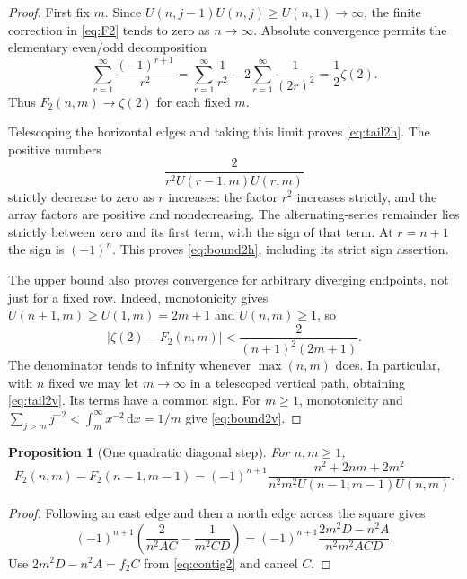 \documentclass[11pt]{article}
\numberwithin{equation}{section}
\newtheorem{proposition}[theorem]{Proposition}
\theoremstyle{definition}
\theoremstyle{remark}
\newcommand{\dd}{\,\mathrm d}
\begin{document}
\begin{proof}
First fix $m$. Since $U(n,j-1)U(n,j)\geq U(n,1)\to\infty$,
the finite correction in \eqref{eq:F2} tends to zero as $n\to\infty$.
Absolute convergence permits the elementary even/odd decomposition
\[
 \sum_{r=1}^\infty\frac{(-1)^{r+1}}{r^2}
 =\sum_{r=1}^\infty\frac1{r^2}
   -2\sum_{r=1}^\infty\frac1{(2r)^2}
 =\frac12\zeta(2).
\]
Thus $F_2(n,m)\to\zeta(2)$ for each fixed $m$.

Telescoping the horizontal edges and taking this limit proves
\eqref{eq:tail2h}. The positive numbers
\[
 \frac{2}{r^2U(r-1,m)U(r,m)}
\]
strictly decrease to zero as $r$ increases: the factor $r^2$ increases
strictly, and the array factors are positive and nondecreasing.
The alternating-series remainder lies strictly between zero and its
first term, with the sign of that term. At $r=n+1$ the sign is $(-1)^n$.
This proves \eqref{eq:bound2h}, including its strict sign assertion.

The upper bound also proves convergence for arbitrary diverging
endpoints, not just for a fixed row. Indeed, monotonicity gives
$U(n+1,m)\geq U(1,m)=2m+1$ and $U(n,m)\geq1$, so
\begin{equation}\label{eq:uniform2}
 |\zeta(2)-F_2(n,m)|
 <\frac2{(n+1)^2(2m+1)}.
\end{equation}
The denominator tends to infinity whenever $\max(n,m)$ does.
In particular, with $n$ fixed we may let $m\to\infty$ in a telescoped
vertical path, obtaining \eqref{eq:tail2v}. Its terms have a common sign.
For $m\geq1$, monotonicity and
$\sum_{j>m}j^{-2}<\int_m^\infty x^{-2}\dd x=1/m$
give \eqref{eq:bound2v}.
\end{proof}

\begin{proposition}[One quadratic diagonal step]\label{prop:step2}
For $n,m\geq1$,
\begin{equation}\label{eq:step2}
 F_2(n,m)-F_2(n-1,m-1)
 =(-1)^{n+1}\frac{n^2+2nm+2m^2}
 {n^2m^2U(n-1,m-1)U(n,m)}.
\end{equation}
\end{proposition}
\begin{proof}
Following an east edge and then a north edge across the square gives
\[
 (-1)^{n+1}\left(\frac2{n^2AC}-\frac1{m^2CD}\right)
 =(-1)^{n+1}\frac{2m^2D-n^2A}{n^2m^2ACD}.
\]
Use $2m^2D-n^2A=f_2C$ from \eqref{eq:contig2} and cancel $C$.
\end{proof}
\end{document}
